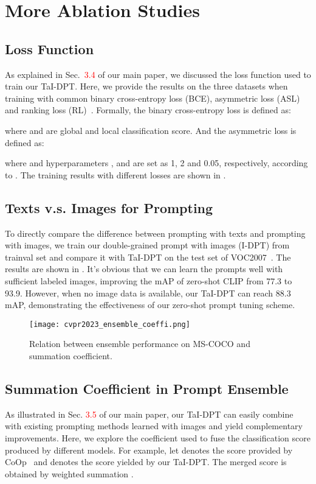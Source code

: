 \documentclass[10pt,twocolumn,letterpaper]{article}
\begin{document}
\section{More Ablation Studies}
\label{sec:ablation_supp}

\subsection{Loss Function}
\label{sec:loss}
As explained in Sec.~\textcolor{red}{3.4} of our main paper, we discussed the loss function used to train our TaI-DPT. Here, we provide the results on the three datasets when training with common binary cross-entropy loss (BCE), asymmetric loss (ASL)~\cite{benbaruch2020asymmetric} and ranking loss (RL)~\cite{rankingloss}.
Formally, the binary cross-entropy loss is defined as:

\noindent where  and  are global and local classification score. And the asymmetric loss is defined as:

\noindent where  and hyperparameters ,  and  are set as 1, 2 and 0.05, respectively, according to \cite{dualcoop}. The training results with different losses are shown in .


\subsection{Texts v.s. Images for Prompting}
\label{sec:tai_supp}
To directly compare the difference between prompting with texts and prompting with images, we train our double-grained prompt with images (I-DPT) from trainval set and compare it with TaI-DPT on the test set of VOC2007~\cite{voc2007}. The results are shown in . It's obvious that we can learn the prompts well with sufficient labeled images, improving the mAP of zero-shot CLIP from 77.3 to 93.9. However, when no image data is available, our TaI-DPT can reach 88.3 mAP, demonstrating the effectiveness of our zero-shot prompt tuning scheme.



\begin{figure}
  \centering
\texttt{[image: cvpr2023\_ensemble\_coeffi.png]}
  \vspace{-3mm}
  \caption{Relation between ensemble performance on MS-COCO and summation coefficient.}
  \label{fig:ensemble_coeffi}
\end{figure}

\subsection{Summation Coefficient in Prompt Ensemble}
\label{sec:ensemble_supp}
As illustrated in Sec. \textcolor{red}{3.5} of our main paper, our TaI-DPT can easily combine with existing prompting methods learned with images and yield complementary improvements. Here, we explore the coefficient used to fuse the classification score produced by different models. For example, let  denotes the score provided by CoOp~\cite{coop} and  denotes the score yielded by our TaI-DPT. The merged score is obtained by weighted summation . 
\end{document}

